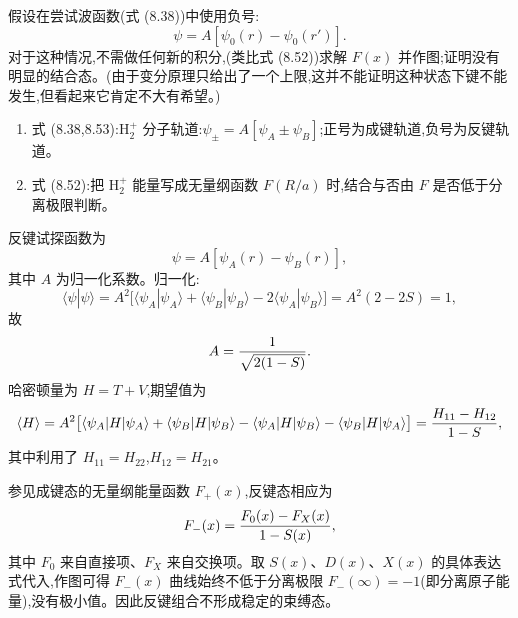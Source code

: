 \begin{question}
假设在尝试波函数(式 (8.38))中使用负号:
\[
\psi=A[\psi_0(r)-\psi_0(r')].
\]
对于这种情况,不需做任何新的积分,(类比式 (8.52))求解 $F(x)$ 并作图;证明没有明显的结合态。(由于变分原理只给出了一个上限,这并不能证明这种状态下键不能发生,但看起来它肯定不大有希望。)

\par\smallskip
{}
\begin{enumerate}[leftmargin=2.2em,itemsep=0.12em,topsep=0.12em,parsep=0pt]
\item 式 (8.38,8.53):$\mathrm H_2^+$ 分子轨道:$\psi_\pm=A[\psi_A\pm\psi_B]$;正号为成键轨道,负号为反键轨道。
\item 式 (8.52):把 $\mathrm H_2^+$ 能量写成无量纲函数 $F(R/a)$ 时,结合与否由 $F$ 是否低于分离极限判断。
\end{enumerate}

\begin{solution}
反键试探函数为
\[
\psi=A[\psi_A(r)-\psi_B(r)],
\]
其中 $A$ 为归一化系数。归一化:
\[
\langle\psi|\psi\rangle=A^2\bigl[\langle\psi_A|\psi_A\rangle+\langle\psi_B|\psi_B\rangle-2\langle\psi_A|\psi_B\rangle\bigr]
=A^2(2-2S)=1,
\]
故
\[
A={1\over\sqrt{2(1-S)}}.
\]
哈密顿量为 $H=T+V$,期望值为
\[
\langle H\rangle=
{A^2}\bigl[\langle\psi_A|H|\psi_A\rangle+\langle\psi_B|H|\psi_B\rangle
-\langle\psi_A|H|\psi_B\rangle-\langle\psi_B|H|\psi_A\rangle\bigr]
={H_{11}-H_{12}\over1-S},
\]
其中利用了 $H_{11}=H_{22}$,$H_{12}=H_{21}$。

参见成键态的无量纲能量函数 $F_+(x)$,反键态相应为
\[
F_-(x)={F_0(x)-F_X(x)\over1-S(x)},
\]
其中 $F_0$ 来自直接项、$F_X$ 来自交换项。取 $S(x)$、$D(x)$、$X(x)$ 的具体表达式代入,作图可得 $F_-(x)$ 曲线始终不低于分离极限 $F_-(\infty)=-1$(即分离原子能量),没有极小值。因此反键组合不形成稳定的束缚态。
\end{solution}
\end{question}

